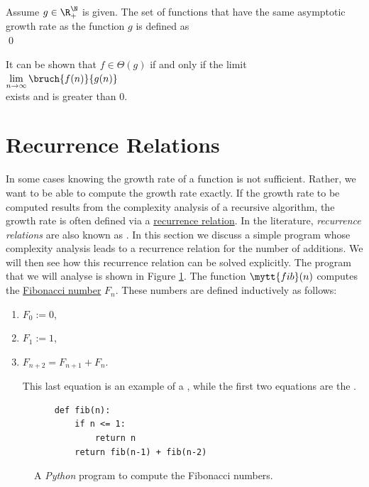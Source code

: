 \begin{Definition}[$\Theta(g)$] 
  Assume $g \in \R_+^{\N}$ is given.   The set of functions that have the same asymptotic growth rate
  as the function $g$ is defined as
  \\[0.2cm]
  \hspace*{0.5cm} 
  \colorbox{red}{}
  \qed 
\end{Definition}

\noindent
It can be shown that $f \in \Theta(g)$ if and only if the limit
\\[0.4cm]
\hspace*{1.3cm}
$\lim\limits_{n \rightarrow \infty} \bruch{f(n)}{g(n)}$
\\[0.2cm]
exists and is greater than $0$.

\section{Recurrence Relations}
In some cases knowing the growth rate of a function is not sufficient.  Rather, we want to be able to compute
the growth rate exactly.  If the growth rate to be computed results from the complexity analysis of a recursive
algorithm, the growth rate is often defined via a
\href{https://en.wikipedia.org/wiki/Recurrence_relation}{recurrence relation}.  In the literature,
\emph{recurrence relations} are also known as .
In this section we discuss a simple program whose complexity analysis leads to a recurrence relation for the 
number of additions.  We will then see how this recurrence relation can be solved explicitly.  The program that
we will analyse is shown in Figure \ref{fig:Fibonacci.ipynb}.  The function $\mytt{fib}(n)$ computes the
\href{https://en.wikipedia.org/wiki/Fibonacci_number}{Fibonacci number}  $F_n$.  These
numbers are defined inductively as follows:
\begin{enumerate}
\item $F_0 := 0$,
\item $F_1 := 1$, 
\item $F_{n+2} = F_{n+1} + F_n$.

  This last equation is an example of a , while the first two equations are the
  . 
\end{enumerate}

\begin{figure}[!h]
  \centering
\begin{verbatim}
    def fib(n):
        if n <= 1:
            return n
        return fib(n-1) + fib(n-2)
\end{verbatim}
\vspace*{-0.3cm}
  \caption{A \textsl{Python} program to compute the Fibonacci numbers.}
  \label{fig:Fibonacci.ipynb}
\end{figure} 

